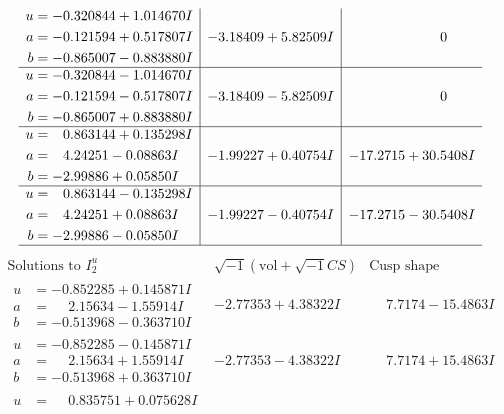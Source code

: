\documentclass[1p]{elsarticle_modified}
\theoremstyle{definition}
\newcommand{\I}{\sqrt{-1}}
\begin{document}
$$\begin{array}{c|c|c}
\begin{aligned}
u &= -0.320844 + 1.014670 I \\
a &= -0.121594 + 0.517807 I \\
b &= -0.865007 - 0.883880 I\end{aligned}
 & -3.18409 + 5.82509 I & \phantom{-0.000000 } 0 \\ \hline\begin{aligned}
u &= -0.320844 - 1.014670 I \\
a &= -0.121594 - 0.517807 I \\
b &= -0.865007 + 0.883880 I\end{aligned}
 & -3.18409 - 5.82509 I & \phantom{-0.000000 } 0 \\ \hline\begin{aligned}
u &= \phantom{-}0.863144 + 0.135298 I \\
a &= \phantom{-}4.24251 - 0.08863 I \\
b &= -2.99886 + 0.05850 I\end{aligned}
 & -1.99227 + 0.40754 I & -17.2715 + 30.5408 I \\ \hline\begin{aligned}
u &= \phantom{-}0.863144 - 0.135298 I \\
a &= \phantom{-}4.24251 + 0.08863 I \\
b &= -2.99886 - 0.05850 I\end{aligned}
 & -1.99227 - 0.40754 I & -17.2715 - 30.5408 I\\
 \hline 
 \end{array}$$\newpage$$\begin{array}{c|c|c}  
\text{Solutions to }I^u_{2}& \I (\text{vol} + \sqrt{-1}CS) & \text{Cusp shape}\\
 \hline 
\begin{aligned}
u &= -0.852285 + 0.145871 I \\
a &= \phantom{-}2.15634 - 1.55914 I \\
b &= -0.513968 - 0.363710 I\end{aligned}
 & -2.77353 + 4.38322 I & \phantom{-}7.7174 - 15.4863 I \\ \hline\begin{aligned}
u &= -0.852285 - 0.145871 I \\
a &= \phantom{-}2.15634 + 1.55914 I \\
b &= -0.513968 + 0.363710 I\end{aligned}
 & -2.77353 - 4.38322 I & \phantom{-}7.7174 + 15.4863 I \\ \hline\begin{aligned}
u &= \phantom{-}0.835751 + 0.075628 I \\

\end{aligned}
\end{array}$$
\end{document}
